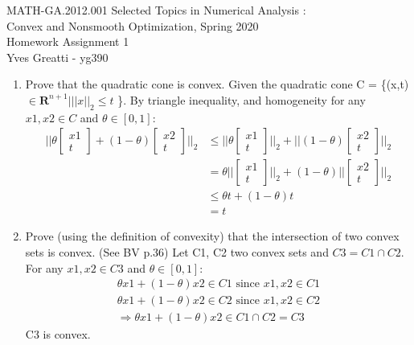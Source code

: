 \documentclass[10pt]{article}
\newcommand{\0}{\mat{0}}
\begin{document}
\noindent MATH-GA.2012.001 Selected Topics in Numerical Analysis :\\
Convex and Nonsmooth Optimization, Spring 2020\\
Homework Assignment 1 \\
Yves Greatti - yg390\\

\begin{enumerate}
\item Prove that the quadratic cone is convex.
Given the quadratic cone C = \{(x,t) $\in \mathbf{R}^{n+1} | ||x||_2 \le t$ \}. By triangle inequality, and homogeneity for any $x1,x2 \in C$ and $\theta \in [0,1]$:
\begin{align*}
|| \theta 
		\begin{bmatrix}
    			x1 \\ 
			t
		\end{bmatrix} 
+ (1 - \theta) 
		\begin{bmatrix}
    			x2 \\ 
			t
		\end{bmatrix} ||_2 &\le 
|| \theta 
		\begin{bmatrix}
    			x1 \\ 
			t
		\end{bmatrix} ||_2 +	
|| (1 - \theta) 
		\begin{bmatrix}
    			x2 \\ 
			t
		\end{bmatrix} ||_2 \\
		&= \theta ||
		\begin{bmatrix}
    			x1 \\ 
			t
		\end{bmatrix} ||_2 +	
(1 - \theta) ||
		\begin{bmatrix}
    			x2 \\ 
			t
		\end{bmatrix} ||_2 \\
		& \le \theta t + (1-\theta) t \\
		&= t	
\end{align*}

\item Prove (using the definition of convexity) that the intersection of two convex sets is convex. (See BV p.36) 
Let C1, C2 two convex sets and $C3 = C1 \cap C2$. For any $x1, x2 \in C3$ and $\theta \in [0,1]$:
\begin{align*}
	\theta x1 + (1-\theta) x2 \in C1 \text{ since } x1, x2  \in C1 \\
	\theta x1 + (1-\theta) x2 \in C2 \text{ since } x1, x2  \in C2 \\
	\Rightarrow \theta x1 + (1-\theta) x2 \in C1 \cap C2 = C3
\end{align*}
C3 is convex.


\end{enumerate}
\end{document}
